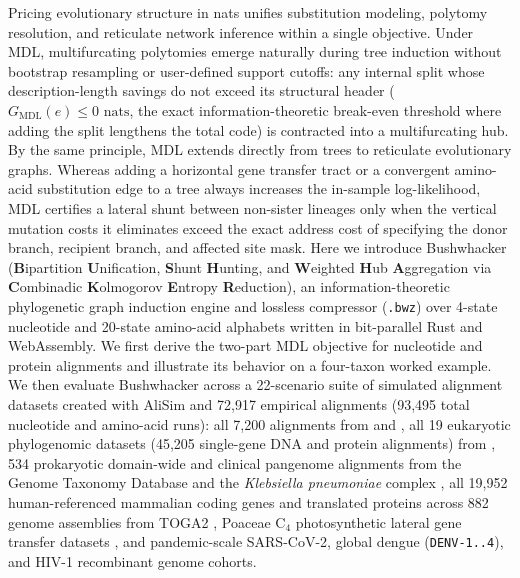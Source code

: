 \documentclass[11pt,a4paper]{article}
\begin{document}
Pricing evolutionary structure in nats unifies substitution modeling, polytomy resolution, and reticulate network inference within a single objective. Under MDL, multifurcating polytomies emerge naturally during tree induction without bootstrap resampling or user-defined support cutoffs: any internal split whose description-length savings do not exceed its structural header ($G_{\text{MDL}}(e) \le 0\text{ nats}$, the exact information-theoretic break-even threshold where adding the split lengthens the total code) is contracted into a multifurcating hub. By the same principle, MDL extends directly from trees to reticulate evolutionary graphs. Whereas adding a horizontal gene transfer tract or a convergent amino-acid substitution edge to a tree always increases the in-sample log-likelihood, MDL certifies a lateral shunt between non-sister lineages only when the vertical mutation costs it eliminates exceed the exact address cost of specifying the donor branch, recipient branch, and affected site mask. Here we introduce Bushwhacker (\textbf{B}ipartition \textbf{U}nification, \textbf{S}hunt \textbf{H}unting, and \textbf{W}eighted \textbf{H}ub \textbf{A}ggregation via \textbf{C}ombinadic \textbf{K}olmogorov \textbf{E}ntropy \textbf{R}eduction), an information-theoretic phylogenetic graph induction engine and lossless compressor (\texttt{.bwz}) over 4-state nucleotide and 20-state amino-acid alphabets written in bit-parallel Rust and WebAssembly. We first derive the two-part MDL objective for nucleotide and protein alignments and illustrate its behavior on a four-taxon worked example. We then evaluate Bushwhacker across a 22-scenario suite of simulated alignment datasets created with AliSim \citep{lytrong2022alisim} and 72,917 empirical alignments (93,495 total nucleotide and amino-acid runs): all 7,200 alignments from \citet{abadi2019model} and \citet{gerth2019cannot}, all 19 eukaryotic phylogenomic datasets (45,205 single-gene DNA and protein alignments) from \citet{zhou2018evaluating}, 534 prokaryotic domain-wide and clinical pangenome alignments from the Genome Taxonomy Database \citep{parks2018gtdb,parks2020gtdb} and the \textit{Klebsiella pneumoniae} complex \citep{wyres2020population}, all 19,952 human-referenced mammalian coding genes and translated proteins across 882 genome assemblies from TOGA2 \citep{kirilenko2023integrating,malovichko2026toga2}, Poaceae $\text{C}_4$ photosynthetic lateral gene transfer datasets \citep{christin2007c4,christin2012adaptive}, and pandemic-scale SARS-CoV-2, global dengue (\texttt{DENV-1..4}), and HIV-1 recombinant genome cohorts.
\end{document}
